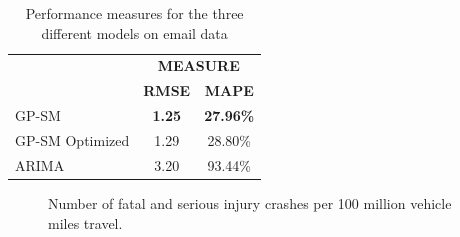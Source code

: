 \documentclass[letterpaper]{article}
\begin{document}
\begin{table}[h]
\caption{Performance measures for the three different models on email data}
\label{tab:performance-measures-emails}
\begin{center}
\begin{tabular}{l@{\qquad}cc}
  \toprule
  \multirow{2}{*}{\raisebox{-\heavyrulewidth}{\bf MODEL}} & \multicolumn{2}{c}{\bf MEASURE} \\
  \cmidrule{2-3}
  & {\bf RMSE} & {\bf MAPE} \\
  \midrule
  GP-SM & {\bf 1.25} & {\bf 27.96\%}  \\
  GP-SM Optimized & 1.29 & 28.80\%  \\
  ARIMA & 3.20 & 93.44\%  \\
  \bottomrule
\end{tabular}
\end{center}
\end{table}

\begin{figure}[t]
     \hfill
     \caption{Number of fatal and serious injury crashes per 100 million vehicle miles travel.}
     \label{fig:data-crashes}
\end{figure}
\end{document}
